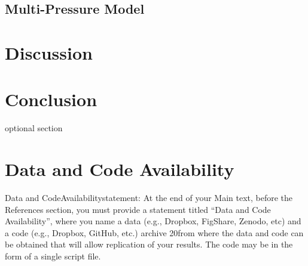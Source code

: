 \documentclass[11pt, a4paper, titlepage]{article}
\begin{document}
	 
	 \subsection*{Multi-Pressure Model}
	 
	 

    \clearpage
    
     \section*{Discussion}
     
     \clearpage
     
     \section*{Conclusion }
     optional section
     \clearpage
    
    \section*{Data and Code Availability}
    Data  and  CodeAvailabilitystatement:  At  the  end  of  your  Main  text,  before  the  References section, you must provide a statement titled “Data and Code Availability”, where you name a data (e.g., Dropbox, FigShare, Zenodo, etc) and a code (e.g., Dropbox, GitHub, etc.) archive 
    20from where the data and code can be obtained that will allow replication of your results. The code may be in the form of a single script file.
    
    \clearpage
    

    
\end{document}
